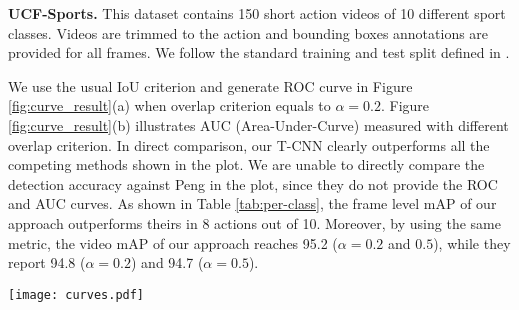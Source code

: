 \documentclass[10pt,twocolumn,letterpaper]{article}
\begin{document}
\textbf{UCF-Sports.} This dataset contains 150 short action videos of 10 different sport classes. Videos are trimmed to the action and bounding boxes annotations are provided for all frames.
We follow the standard training and test split defined in \cite{lan2011discriminative}.

We use the usual IoU criterion and generate ROC curve in Figure \ref{fig:curve_result}(a) when overlap criterion equals to $\alpha = 0.2$. Figure \ref{fig:curve_result}(b) illustrates AUC (Area-Under-Curve) measured with different overlap criterion. In direct comparison, our T-CNN clearly outperforms all the competing methods shown in the plot. We are unable to directly compare the detection accuracy against Peng \etal \cite{2stream-rcnn_peng:hal-01349107} in the plot, since they do not provide the ROC and AUC curves. As shown in Table \ref{tab:per-class}, the frame level mAP of our approach outperforms theirs in 8 actions out of 10. Moreover, by using the same metric, the video mAP of our approach reaches 95.2 ($\alpha = 0.2$ and $0.5$), while they report 94.8 ($\alpha = 0.2$) and 94.7 ($\alpha = 0.5$).


\begin{figure*}[!thb]
\centering
\texttt{[image: curves.pdf]}
\caption{The ROC and AUC curves for UCF-Sports Dataset \cite{rodriguez2008action} are shown in (a) and (b), respectively. The results are shown for Jain \etal \cite{jain2014action} (green), Tian \etal \cite{tian2013spatiotemporal} (purple), Soomro \etal \cite{soomro2015action} (blue), Wang \etal \cite{wang2014video} (yellow), Gkioxari \etal \cite{gkioxari2015finding} (cyan) and Proposed Method (red). (c) shows the mean ROC curves for four actions of THUMOS'14. The results are shown for Sultani \etal \cite{Sultani_2016_CVPR} (green), proposed method (red) and proposed method without negative mining (blue).}
\label{fig:curve_result}
\end{figure*}
\end{document}

